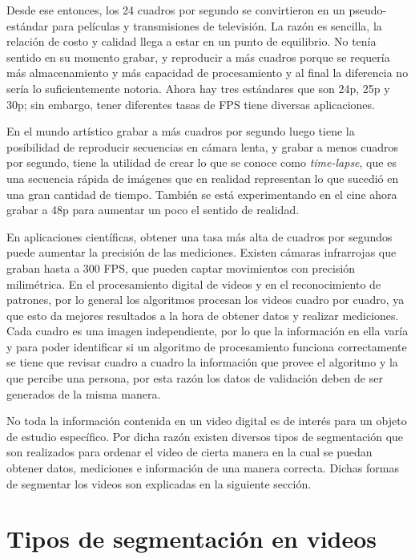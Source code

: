 Desde ese entonces, los 24 cuadros por segundo se convirtieron en un pseudo-estándar para películas y transmisiones de televisión. La razón es sencilla, la relación de costo y calidad llega a estar en un punto de equilibrio. No tenía sentido en su momento grabar, y reproducir a más cuadros porque se requería más almacenamiento y más capacidad de procesamiento y al final la diferencia no sería lo suficientemente notoria. Ahora hay tres estándares que son 24p, 25p y 30p; sin embargo, tener diferentes tasas de FPS tiene diversas aplicaciones.

En el mundo artístico grabar a más cuadros por segundo luego tiene la posibilidad de reproducir secuencias en cámara lenta, y grabar a menos cuadros por segundo, tiene la utilidad de crear lo que se conoce como \emph{time-lapse}, que es una secuencia rápida de imágenes que en realidad representan lo que sucedió en una gran cantidad de tiempo. También se está experimentando en el cine ahora grabar a 48p para aumentar un poco el sentido de realidad.

En aplicaciones científicas, obtener una tasa más alta de cuadros por segundos puede aumentar la precisión de las mediciones. Existen cámaras infrarrojas que graban hasta a 300 FPS, que pueden captar movimientos con precisión milimétrica. En el procesamiento digital de videos y en el reconocimiento de patrones, por lo general los algoritmos procesan los videos cuadro por cuadro, ya que esto da mejores resultados a la hora de obtener datos y realizar mediciones. Cada cuadro es una imagen independiente, por lo que la información en ella varía y para poder identificar si un algoritmo de procesamiento funciona correctamente se tiene que revisar cuadro a cuadro la información que provee el algoritmo y la que percibe una persona, por esta razón los datos de validación deben de ser generados de la misma manera. 

No toda la información contenida en un video digital es de interés para un objeto de estudio específico. Por dicha razón existen diversos tipos de segmentación que son realizados para ordenar el video de cierta manera en la cual se puedan obtener datos, mediciones e información de una manera correcta. Dichas formas de segmentar los videos son explicadas en la siguiente sección.

\section{Tipos de segmentación en videos}

